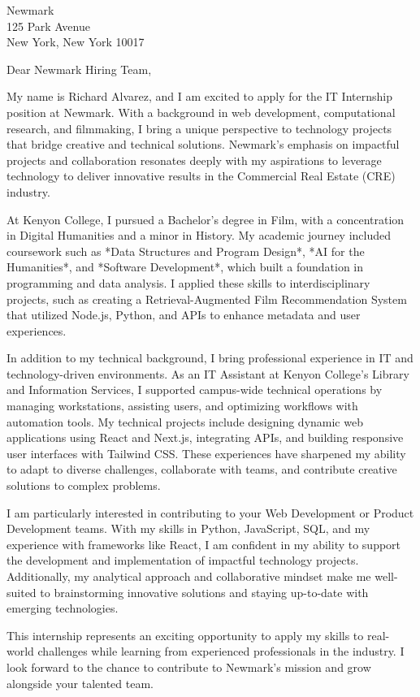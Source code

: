 \documentclass[a4paper,10pt]{letter}
\begin{document}
\begin{letter}{Newmark \\
125 Park Avenue \\
New York, New York 10017
}

\opening{Dear Newmark Hiring Team,}

My name is Richard Alvarez, and I am excited to apply for the IT Internship position at Newmark. With a background in web development, computational research, and filmmaking, I bring a unique perspective to technology projects that bridge creative and technical solutions. Newmark’s emphasis on impactful projects and collaboration resonates deeply with my aspirations to leverage technology to deliver innovative results in the Commercial Real Estate (CRE) industry.

At Kenyon College, I pursued a Bachelor’s degree in Film, with a concentration in Digital Humanities and a minor in History. My academic journey included coursework such as *Data Structures and Program Design*, *AI for the Humanities*, and *Software Development*, which built a foundation in programming and data analysis. I applied these skills to interdisciplinary projects, such as creating a Retrieval-Augmented Film Recommendation System that utilized Node.js, Python, and APIs to enhance metadata and user experiences. 

In addition to my technical background, I bring professional experience in IT and technology-driven environments. As an IT Assistant at Kenyon College’s Library and Information Services, I supported campus-wide technical operations by managing workstations, assisting users, and optimizing workflows with automation tools. My technical projects include designing dynamic web applications using React and Next.js, integrating APIs, and building responsive user interfaces with Tailwind CSS. These experiences have sharpened my ability to adapt to diverse challenges, collaborate with teams, and contribute creative solutions to complex problems.

I am particularly interested in contributing to your Web Development or Product Development teams. With my skills in Python, JavaScript, SQL, and my experience with frameworks like React, I am confident in my ability to support the development and implementation of impactful technology projects. Additionally, my analytical approach and collaborative mindset make me well-suited to brainstorming innovative solutions and staying up-to-date with emerging technologies.

This internship represents an exciting opportunity to apply my skills to real-world challenges while learning from experienced professionals in the industry. I look forward to the chance to contribute to Newmark’s mission and grow alongside your talented team.


\end{letter}
\end{document}
